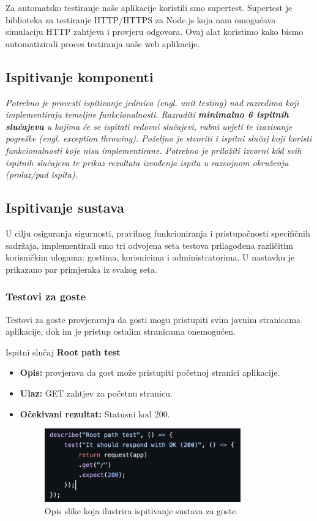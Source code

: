 			Za automatsko testiranje naše aplikacije koristili smo supertest.
			Supertest je biblioteka za testiranje HTTP/HTTPS za Node.js koja nam omogućava simulaciju HTTP zahtjeva i provjeru odgovora.
			Ovaj alat koristimo kako bismo automatizirali proces testiranja naše web aplikacije.
			
			\subsection{Ispitivanje komponenti}
			\textit{Potrebno je provesti ispitivanje jedinica (engl. unit testing) nad razredima koji implementiraju temeljne funkcionalnosti. Razraditi \textbf{minimalno 6 ispitnih slučajeva} u kojima će se ispitati redovni slučajevi, rubni uvjeti te izazivanje pogreške (engl. exception throwing). Poželjno je stvoriti i ispitni slučaj koji koristi funkcionalnosti koje nisu implementirane. Potrebno je priložiti izvorni kôd svih ispitnih slučajeva te prikaz rezultata izvođenja ispita u razvojnom okruženju (prolaz/pad ispita). }
			
			
			
			\subsection{Ispitivanje sustava}
			
			U cilju osiguranja sigurnosti, pravilnog funkcioniranja i pristupačnosti specifičnih sadržaja, 
			implementirali smo tri odvojena seta testova prilagođena različitim korisničkim ulogama: gostima, korisnicima i administratorima.
			U nastavku je prikazano par primjeraka iz svakog seta.

			\subsubsection{Testovi za goste}
			Testovi za goste provjeravaju da gosti mogu pristupiti svim javnim stranicama aplikacije, dok im je pristup ostalim stranicama onemogućen.

			Ispitni slučaj \textbf{Root path test}
			\begin{itemize}
				\item \textbf{Opis:} provjerava da gost može pristupiti početnoj stranici aplikacije.
				\item \textbf{Ulaz:} GET zahtjev za početnu stranicu.
				\item \textbf{Očekivani rezultat:} Statusni kod 200.
				\begin{figure}[h]
					\centering
					\includegraphics[width=0.8\textwidth]{slike/testovi/guest_root_test.png}
					\caption{Opis slike koja ilustrira ispitivanje sustava za goste.}
					\label{fig:testovi_gosti_slika}
				\end{figure}
			\end{itemize}

